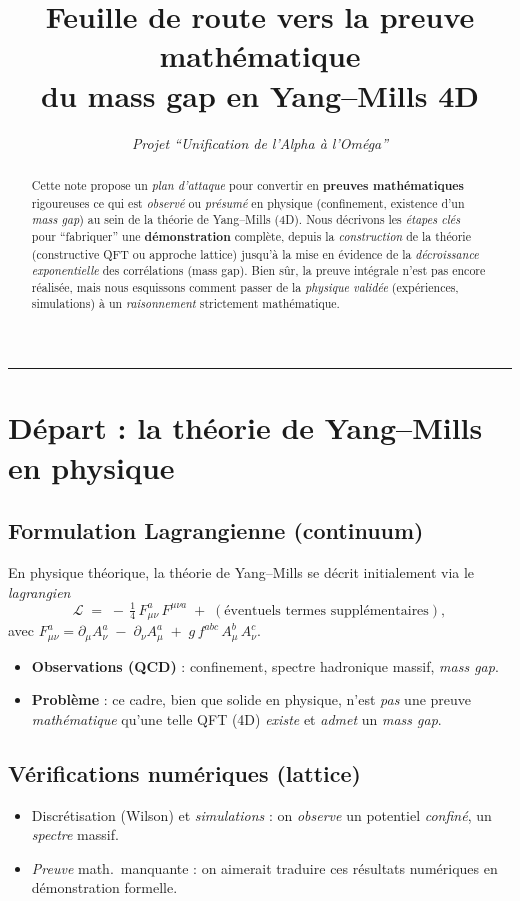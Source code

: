 \documentclass[11pt]{article}
\title{\textbf{Feuille de route vers la preuve mathématique\\
du mass gap en Yang--Mills 4D}}
\author{\textit{Projet “Unification de l’Alpha à l’Oméga”}}
\date{}
\begin{document}
\maketitle

\begin{abstract}
Cette note propose un \emph{plan d’attaque} pour convertir en \textbf{preuves mathématiques} rigoureuses ce qui est \emph{observé} ou \emph{présumé} en physique (confinement, existence d'un \emph{mass gap}) au sein de la théorie de Yang--Mills (4D). Nous décrivons les \emph{étapes clés} pour “fabriquer” une \textbf{démonstration} complète, depuis la \emph{construction} de la théorie (constructive QFT ou approche lattice) jusqu’à la mise en évidence de la \emph{décroissance exponentielle} des corrélations (mass gap). Bien sûr, la preuve intégrale n’est pas encore réalisée, mais nous esquissons comment passer de la \emph{physique validée} (expériences, simulations) à un \emph{raisonnement} strictement mathématique.
\end{abstract}

\hrule
\vspace{6pt}

\section{Départ : la théorie de Yang--Mills en physique}

\subsection{Formulation Lagrangienne (continuum)}
En physique théorique, la théorie de Yang--Mills se décrit initialement via le \emph{lagrangien}
\[
  \mathcal{L}
  \;=\;
  -\,\tfrac{1}{4}\,F_{\mu\nu}^a\,F^{\mu\nu a}
  \;+\;
  (\text{éventuels termes supplémentaires}),
\]
avec $F_{\mu\nu}^a = \partial_\mu A_\nu^a \;-\; \partial_\nu A_\mu^a \;+\;g\,f^{abc}\,A_\mu^b\,A_\nu^c$. 

\begin{itemize}
  \item \textbf{Observations (QCD)} : confinement, spectre hadronique massif, \emph{mass gap}.
  \item \textbf{Problème} : ce cadre, bien que solide en physique, n'est \emph{pas} une preuve \emph{mathématique} qu'une telle QFT (4D) \emph{existe} et \emph{admet} un \emph{mass gap}.
\end{itemize}

\subsection{Vérifications numériques (lattice)}
\begin{itemize}
  \item Discrétisation (Wilson) et \emph{simulations} : on \emph{observe} un potentiel \emph{confiné}, un \emph{spectre} massif.
  \item \emph{Preuve} math.\ manquante : on aimerait traduire ces résultats numériques en démonstration formelle.
\end{itemize}
\end{document}
